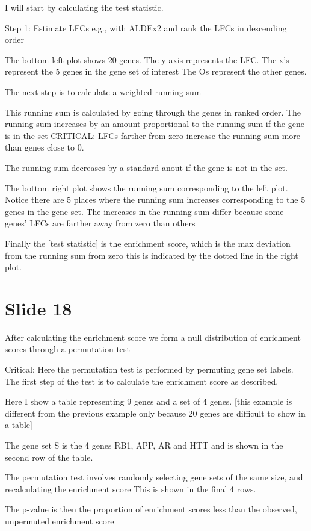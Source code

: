 \documentclass[11pt]{article}
\begin{document}
I will start by calculating the test statistic.

Step 1: Estimate LFCs e.g., with ALDEx2 and rank the LFCs in descending order

The bottom left plot shows 20 genes. The y-axis represents the LFC. The x's represent the 5 genes in the gene set of interest
The Os represent the other genes.

The next step is to calculate a weighted running sum

This running sum is calculated by going through the genes in ranked order.
The running sum increases by an amount proportional to the running sum if the gene is in the set
CRITICAL: LFCs farther from zero increase the running sum more than genes close to 0.

The running sum decreases by a standard anout if the gene is not in the set.

The bottom right plot shows the running sum corresponding to the left plot. Notice there are
5 places where the running sum increases corresponding to the 5 genes in the gene set. The increases
in the running sum differ because some genes' LFCs are farther away from zero than others

Finally the [test statistic] is the enrichment score, which is the max deviation from the running sum from zero
this is indicated by the dotted line in the right plot.

\section{Slide 18}
\label{sec:org7186ab5}

After calculating the enrichment score we form a null distribution of enrichment scores through a permutation test

Critical: Here the permutation test is performed by permuting gene set labels.
The first step of the test is to calculate the enrichment score as described.

Here I show a table representing 9 genes and a set of 4 genes.
[this example is different from the previous example only because 20 genes are difficult to show in a table]

The gene set S is the 4 genes RB1, APP, AR and HTT and is shown in the second row of the table.

The permutation test involves randomly selecting gene sets of the same size, and recalculating the enrichment score
This is shown in the final 4 rows.

The p-value is then the proportion of enrichment scores less than the observed, unpermuted enrichment score
\end{document}
